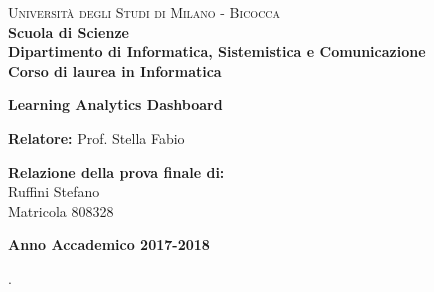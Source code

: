 \documentclass[a4paper,12pt,oneside]{book}
\begin{document}
\frontmatter
\begin{titlepage}
	
	\noindent
        \begin{minipage}[t]{0.19\textwidth}
        \end{minipage}
        \begin{minipage}[t]{0.81\textwidth}
        {
            {\textsc{Università degli Studi di Milano - Bicocca}} \\
            \textbf{Scuola di Scienze} \\
            \textbf{Dipartimento di Informatica, Sistemistica e Comunicazione} \\
            \textbf{Corso di laurea in Informatica} \\
            \par
        }
        \end{minipage}
	
	\vspace{40mm}
	
	\begin{center}
		{\LARGE{
				\textbf{Learning Analytics Dashboard}
				\par
		}}
	\end{center}
	
	\vspace{30mm}
	
	\noindent
	{\large \textbf{Relatore:} Prof. Stella Fabio } \\
		
	\vspace{15mm}
	
	\begin{flushright}
		{\large \textbf{Relazione della prova finale di:}} \\
		\large{Ruffini Stefano} \\
		\large{Matricola 808328} 
	\end{flushright}
	
	\vspace{20mm}
	\begin{center}
		{\large{\bf Anno Accademico 2017-2018}}
	\end{center}
	
	\restoregeometry
	
\end{titlepage}

\tableofcontents

\setlength{\parindent}{0pt}.
\setlength{\parskip}{1em}



\backmatter





\end{document}
